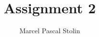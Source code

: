 \documentclass[12pt]{article}
\title{Assignment 2}
\author{\textup{Marcel Pascal Stolin}}
\begin{document}
	
	\newpage
	
    
    \newpage
    
    \newpage
    
    \newpage
    


    \newpage
    \appendix
    
\end{document}
